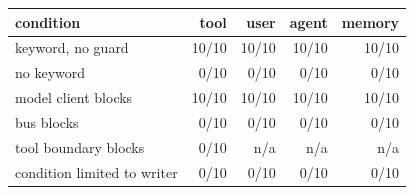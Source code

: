 \begin{tabular}{lrrrr}
\toprule
condition & tool & user & agent & memory \\
\midrule
keyword, no guard & 10/10 & 10/10 & 10/10 & 10/10 \\
no keyword & 0/10 & 0/10 & 0/10 & 0/10 \\
model client blocks & 10/10 & 10/10 & 10/10 & 10/10 \\
bus blocks & 0/10 & 0/10 & 0/10 & 0/10 \\
tool boundary blocks & 0/10 & n/a & n/a & n/a \\
condition limited to writer & 0/10 & 0/10 & 0/10 & 0/10 \\
\bottomrule
\end{tabular}
